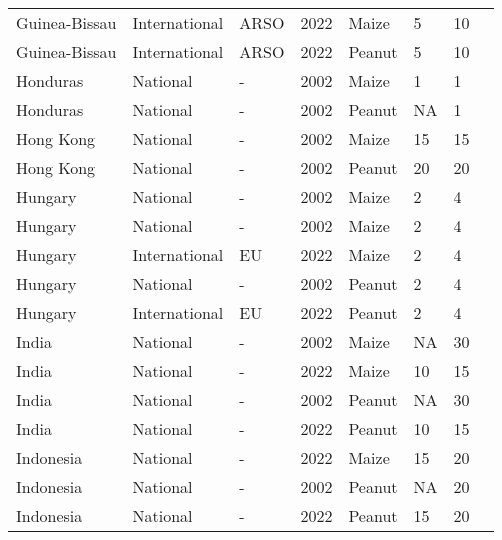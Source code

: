 \begin{landscape}
\begin{longtable}[c]{llllllll}
Guinea-Bissau     & International & ARSO     & 2022 & Maize  & 5  & 10 & \citet{ARSO2022}             \\
Guinea-Bissau     & International & ARSO     & 2022 & Peanut & 5  & 10 & \citet{ARSO2022}             \\
Honduras          & National      & -        & 2002 & Maize  & 1  & 1  & \citet{van2004worldwide}     \\
Honduras          & National      & -        & 2002 & Peanut & NA & 1  & \citet{van2004worldwide}     \\
Hong Kong         & National      & -        & 2002 & Maize  & 15 & 15 & \citet{van2004worldwide}     \\
Hong Kong         & National      & -        & 2002 & Peanut & 20 & 20 & \citet{van2004worldwide}     \\
Hungary           & National      & -        & 2002 & Maize  & 2  & 4  & \citet{van2004worldwide}     \\
Hungary           & National      & -        & 2002 & Maize  & 2  & 4  & \citet{van2004worldwide}     \\
Hungary           & International & EU       & 2022 & Maize  & 2  & 4  & \citet{EC2010}               \\
Hungary           & National      & -        & 2002 & Peanut & 2  & 4  & \citet{van2004worldwide}     \\
Hungary           & International & EU       & 2022 & Peanut & 2  & 4  & \citet{EC2010}               \\
India             & National      & -        & 2002 & Maize  & NA & 30 & \citet{van2004worldwide}     \\
India             & National      & -        & 2022 & Maize  & 10 & 15 & \citet{FSSAI2011}            \\
India             & National      & -        & 2002 & Peanut & NA & 30 & \citet{van2004worldwide}     \\
India             & National      & -        & 2022 & Peanut & 10 & 15 & \citet{FSSAI2011}            \\
Indonesia         & National      & -        & 2022 & Maize  & 15 & 20 & \citet{MOA2018}              \\
Indonesia         & National      & -        & 2002 & Peanut & NA & 20 & \citet{van2004worldwide}     \\
Indonesia         & National      & -        & 2022 & Peanut & 15 & 20 & \citet{MOA2018}              \\

\end{longtable}
\end{landscape}
